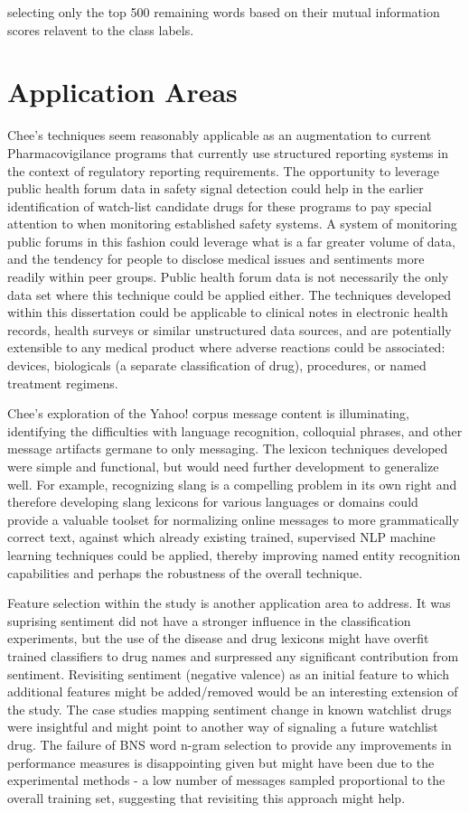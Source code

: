 \documentclass[twoside,11pt]{article}
\begin{document}
selecting only the top 500 remaining words based on their mutual information scores relavent to the class labels.


\section{Application Areas}
Chee's techniques seem reasonably applicable as an augmentation to current Pharmacovigilance programs that currently use structured reporting systems in the context of regulatory reporting requirements. The opportunity to leverage public health forum data in safety signal detection could help in the earlier identification of watch-list candidate drugs for these programs to pay special attention to when monitoring established safety systems. A system of monitoring public forums in this fashion could leverage what is a far greater volume of data, and the tendency for people to disclose medical issues and sentiments more readily within peer groups. Public health forum data is not necessarily the only data set where this technique could be applied either. The techniques developed within this dissertation could be applicable to clinical notes in electronic health records, health surveys or similar unstructured data sources, and are potentially extensible to any medical product where adverse reactions could be associated: devices, biologicals (a separate classification of drug), procedures, or named treatment regimens.

Chee's exploration of the Yahoo! corpus message content is illuminating, identifying the difficulties with language recognition, colloquial phrases, and other message artifacts germane to only messaging. The lexicon techniques developed were simple and functional, but would need further development to generalize well. For example, recognizing slang is a compelling problem in its own right and therefore developing slang lexicons for various languages or domains could provide a valuable toolset for normalizing online messages to more grammatically correct text, against which already existing trained, supervised NLP machine learning techniques could be applied, thereby improving named entity recognition capabilities and perhaps the robustness of the overall technique.

Feature selection within the study is another application area to address. It was suprising sentiment did not have a stronger influence in the classification experiments, but the use of the disease and drug lexicons might have overfit trained classifiers to drug names and surpressed any significant contribution from sentiment. Revisiting sentiment (negative valence) as an initial feature to which additional features might be added/removed would be an interesting extension of the study. The case studies mapping sentiment change in known watchlist drugs were insightful and might point to another way of signaling a future watchlist drug. The failure of BNS word n-gram selection to provide any improvements in performance measures is disappointing given \citep{Forman} but might have been due to the experimental methods - a low number of messages sampled proportional to the overall training set, suggesting that revisiting this approach might help.
\end{document}
